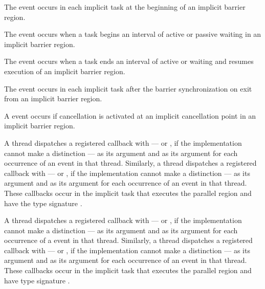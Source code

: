 \events

The  event occurs in each implicit task
at the beginning of an implicit barrier region.

The  event occurs when a task begins an interval of
active or passive waiting in an implicit barrier region.

The  event occurs when a task ends an interval of
active or waiting and resumes execution of an implicit barrier region.

The  event occurs in each implicit task after the
barrier synchronization on exit from an implicit barrier region.

A  event occurs if cancellation is activated at an
implicit cancellation point in an implicit barrier region.

\tools

A thread dispatches a registered 
callback with  --- or
, if the implementation cannot make a
distinction --- as its  argument and  
as its  argument for each occurrence of an  
event in that thread. Similarly, a thread dispatches a registered 
 callback with 
 --- or , 
if the implementation cannot make a distinction --- as its  argument 
and  as its  argument for each  occurrence 
of an  event in that thread. These callbacks occur in 
the implicit task that executes the parallel region and have the type signature 
.

A thread dispatches a registered  callback
with  --- or , 
if the implementation cannot make a distinction --- as its  argument and
 as its  argument for each occurrence of 
a  event in that thread. Similarly, a thread 
dispatches a registered  callback with 
 --- or , 
if the implementation cannot make a distinction --- as its  argument and
 as its  argument for each occurrence of an 
 event in that thread. These callbacks occur in 
the implicit task that executes the parallel region and have type signature 
.

